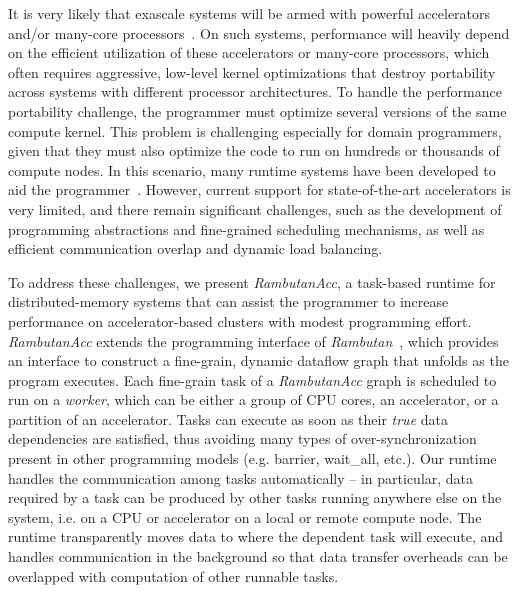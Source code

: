 It is very likely that exascale systems will be armed with powerful accelerators and/or many-core processors~\cite{ASCR/Exascale/Lethin, exascaleRoadMap}.
On such systems, performance will heavily depend on the efficient utilization of these accelerators or many-core processors, which often requires aggressive, low-level kernel optimizations that destroy portability across systems with different processor architectures.
To handle the performance portability challenge, the programmer must optimize several versions of the same compute kernel.
This problem is challenging especially for domain programmers, given that they must also optimize the code to run on hundreds or thousands of compute nodes.
In this scenario, many runtime systems have been developed to aid the programmer~\cite{legion,physics,mpiacc,mvapich2gpu}.
However, current support for state-of-the-art accelerators is very limited, and there remain significant challenges, such as the development of programming abstractions and fine-grained scheduling mechanisms, as well as efficient communication overlap and dynamic load balancing.  

To address these challenges, we present {\em RambutanAcc}, a task-based runtime for distributed-memory systems that can assist the programmer to increase performance on accelerator-based clusters with modest programming effort.
{\em RambutanAcc} extends the programming interface of {\em Rambutan}~\cite{rambutanWebsite}, which provides an interface to construct a fine-grain, dynamic dataflow graph that unfolds as the program executes. 
Each fine-grain task of a {\em RambutanAcc} graph is scheduled to run on a {\em worker}, which can be either a group of CPU cores, an accelerator, or a partition of an accelerator.
Tasks can execute as soon as their {\em true} data dependencies are satisfied, thus avoiding many types of over-synchronization present in other programming models (e.g. barrier, wait\_all, etc.).
Our runtime handles the communication among tasks automatically -- in particular, data required by a task can be produced by other tasks running anywhere else on the system, i.e. on a CPU or accelerator on a local or remote compute node.
The runtime transparently moves data to where the dependent task will execute, and
handles communication in the background so that data transfer overheads can be overlapped with computation of other runnable tasks.

